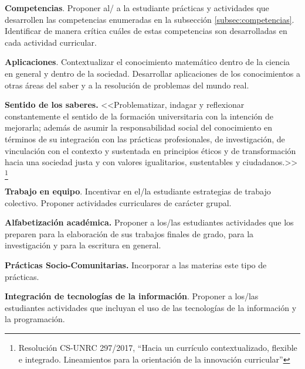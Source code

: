 \documentclass[a4paper, 12pt]{article}
\begin{document}
\begin{description}
  



\item{\textbf{Competencias}.} Proponer al/ a la estudiante prácticas y actividades que desarrollen las competencias enumeradas en la subsección \ref{subsec:competencias}. Identificar de manera crítica cuáles de estas competencias son desarrolladas en cada actividad curricular.


\item{\textbf{Aplicaciones}.}  Contextualizar el conocimiento matemático dentro de la ciencia en general y dentro de la sociedad. Desarrollar aplicaciones de los conocimientos a otras áreas del saber y a la resolución de problemas del mundo real. 




\item{ \textbf{Sentido de los saberes.}} <<Problematizar, indagar y reflexionar constantemente el sentido de la formación
universitaria con la intención de mejorarla; además de asumir la responsabilidad social del
conocimiento en términos de su integración con las prácticas profesionales, de investigación, de
vinculación con el contexto y sustentada en principios éticos y de transformación hacia una
sociedad justa y con valores igualitarios, sustentables y ciudadanos.>> \footnote{Resolución CS-UNRC 297/2017, ``Hacia   un   currículo contextualizado, flexible e integrado. Lineamientos para la orientación de la innovación  curricular''}

\item{\textbf{Trabajo en equipo}.} Incentivar en el/la estudiante estrategias de trabajo colectivo. Proponer actividades curriculares   de carácter  grupal.



\item{ \textbf{Alfabetización académica.}} Proponer a los/las estudiantes actividades que los preparen para la
elaboración de sus trabajos finales de grado, para la investigación y para la escritura en general. 




\item{\textbf{Prácticas Socio-Comunitarias.} } Incorporar a las materias este tipo de prácticas.


\item{ \textbf{Integración de tecnologías de la información}.} Proponer a los/las estudiantes actividades que incluyan el uso de las tecnologías de la información y la programación.  




\end{description}
\end{document}
